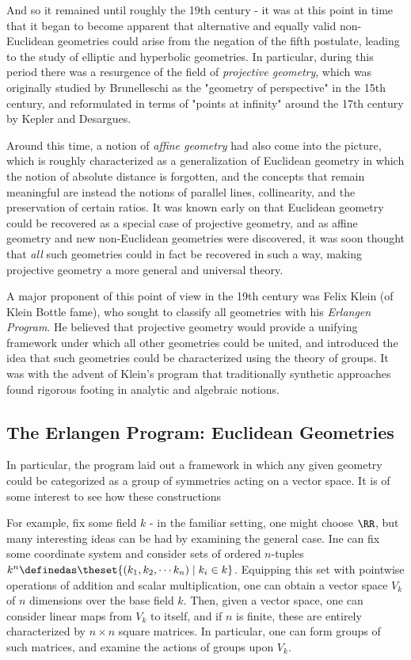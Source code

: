 \documentclass[]{article}
\begin{document}
And so it remained until roughly the 19th century - it was at this point
in time that it began to become apparent that alternative and equally
valid non-Euclidean geometries could arise from the negation of the
fifth postulate, leading to the study of elliptic and hyperbolic
geometries. In particular, during this period there was a resurgence of
the field of \emph{projective geometry}, which was originally studied by
Brunelleschi as the "geometry of perspective" in the 15th century, and
reformulated in terms of "points at infinity" around the 17th century by
Kepler and Desargues.

Around this time, a notion of \emph{affine geometry} had also come into
the picture, which is roughly characterized as a generalization of
Euclidean geometry in which the notion of absolute distance is
forgotten, and the concepts that remain meaningful are instead the
notions of parallel lines, collinearity, and the preservation of certain
ratios. It was known early on that Euclidean geometry could be recovered
as a special case of projective geometry, and as affine geometry and new
non-Euclidean geometries were discovered, it was soon thought that
\emph{all} such geometries could in fact be recovered in such a way,
making projective geometry a more general and universal theory.

A major proponent of this point of view in the 19th century was Felix
Klein (of Klein Bottle fame), who sought to classify all geometries with
his \emph{Erlangen Program}. He believed that projective geometry would
provide a unifying framework under which all other geometries could be
united, and introduced the idea that such geometries could be
characterized using the theory of groups. It was with the advent of
Klein's program that traditionally synthetic approaches found rigorous
footing in analytic and algebraic notions.

\subsection{The Erlangen Program: Euclidean
Geometries}\label{header-n37}

In particular, the program laid out a framework in which any given
geometry could be categorized as a group of symmetries acting on a
vector space. It is of some interest to see how these constructions

For example, fix some field \(k\) - in the familiar setting, one might
choose \(\RR\), but many interesting ideas can be had by examining the
general case. Ine can fix some coordinate system and consider sets of
ordered \(n\)-tuples
\(k^n \definedas \theset{(k_1, k_2, \cdots k_n) \mid k_i \in k}\).
Equipping this set with pointwise operations of addition and scalar
multiplication, one can obtain a vector space \(V_k\) of \(n\)
dimensions over the base field \(k\). Then, given a vector space, one
can consider linear maps from \(V_k\) to itself, and if \(n\) is finite,
these are entirely characterized by \(n\times n\) square matrices. In
particular, one can form groups of such matrices, and examine the
actions of groups upon \(V_k\).
\end{document}
